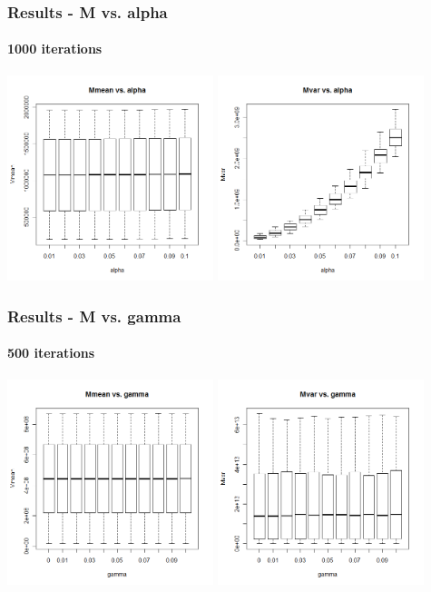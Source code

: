 \begin{frame}
    \frametitle{Results - M vs. alpha }
	\framesubtitle{1000 iterations}
\hspace*{-5mm}
\includegraphics[height=6cm]{boxplot1000_mmean_alpha}
\includegraphics[height=6cm]{boxplot1000_mvar_alpha}
\end{frame}





\begin{frame}
    \frametitle{Results - M vs. gamma }
	\framesubtitle{500 iterations}
\hspace*{-5mm}
\includegraphics[height=6cm]{boxplot500_mmean_gamma}
\includegraphics[height=6cm]{boxplot500_mvar_gamma}
\end{frame}

